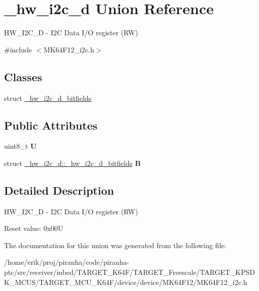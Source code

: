 \hypertarget{union__hw__i2c__d}{}\section{\+\_\+hw\+\_\+i2c\+\_\+d Union Reference}
\label{union__hw__i2c__d}


H\+W\+\_\+\+I2\+C\+\_\+D -\/ I2C Data I/O register (RW)  




{\ttfamily \#include $<$M\+K64\+F12\+\_\+i2c.\+h$>$}

\subsection*{Classes}
\begin{DoxyCompactItemize}
\item 
struct \hyperlink{struct__hw__i2c__d_1_1__hw__i2c__d__bitfields}{\+\_\+hw\+\_\+i2c\+\_\+d\+\_\+bitfields}
\end{DoxyCompactItemize}
\subsection*{Public Attributes}
\begin{DoxyCompactItemize}
\item 
uint8\+\_\+t {\bfseries U}\hypertarget{union__hw__i2c__d_ac4c013225839ac98436dc64e242ee3b0}{}\label{union__hw__i2c__d_ac4c013225839ac98436dc64e242ee3b0}

\item 
struct \hyperlink{struct__hw__i2c__d_1_1__hw__i2c__d__bitfields}{\+\_\+hw\+\_\+i2c\+\_\+d\+::\+\_\+hw\+\_\+i2c\+\_\+d\+\_\+bitfields} {\bfseries B}\hypertarget{union__hw__i2c__d_a5770bd16c811964efd24fc0476ea2a18}{}\label{union__hw__i2c__d_a5770bd16c811964efd24fc0476ea2a18}

\end{DoxyCompactItemize}


\subsection{Detailed Description}
H\+W\+\_\+\+I2\+C\+\_\+D -\/ I2C Data I/O register (RW) 

Reset value\+: 0x00U 

The documentation for this union was generated from the following file\+:\begin{DoxyCompactItemize}
\item 
/home/erik/proj/piranha/code/piranha-\/ptc/src/receiver/mbed/\+T\+A\+R\+G\+E\+T\+\_\+\+K64\+F/\+T\+A\+R\+G\+E\+T\+\_\+\+Freescale/\+T\+A\+R\+G\+E\+T\+\_\+\+K\+P\+S\+D\+K\+\_\+\+M\+C\+U\+S/\+T\+A\+R\+G\+E\+T\+\_\+\+M\+C\+U\+\_\+\+K64\+F/device/device/\+M\+K64\+F12/M\+K64\+F12\+\_\+i2c.\+h\end{DoxyCompactItemize}
